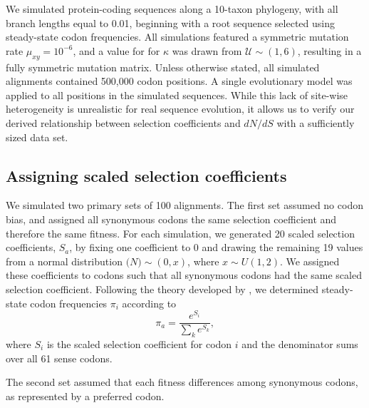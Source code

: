 \documentclass[11pt]{article}
\begin{document}
We simulated protein-coding sequences along a 10-taxon phylogeny, with all branch lengths equal to 0.01, beginning with a root sequence selected using steady-state codon frequencies. All simulations featured a symmetric mutation rate $\mu_{xy} = 10^{-6}$, and a value for for $\kappa$ was drawn from $\mathcal{U} \sim (1,6)$, resulting in a fully symmetric mutation matrix. Unless otherwise stated, all simulated alignments contained 500,000 codon positions. A single evolutionary model was applied to all positions in the simulated sequences. While this lack of site-wise heterogeneity is unrealistic for real sequence evolution, it allows us to verify our derived relationship between selection coefficients and $dN/dS$ with a sufficiently sized data set.

\subsection*{Assigning scaled selection coefficients}

We simulated two primary sets of 100 alignments. The first set assumed no codon bias, and assigned all synonymous codons the same selection coefficient and therefore the same fitness. For each simulation, we generated 20 scaled selection coefficients, $S_a$, by fixing one coefficient to 0 and drawing the remaining 19 values from a normal distribution $\mathcal(N)\sim(0,x)$, where $x \sim U(1,2)$. We assigned these coefficients to codons such that all synonymous codons had the same scaled selection coefficient. Following the theory developed by \cite{SellaHirsh2005}, we determined steady-state codon frequencies $\pi_i$ according to \begin{equation} \pi_a = \frac{e^{S_i}}{\sum_k e^{S_k}}, \end{equation} where $S_i$ is the scaled selection coefficient for codon $i$ and the denominator sums over all 61 sense codons. 


The second set assumed that each fitness differences among synonymous codons, as represented by a preferred codon. 


 
\end{document}
